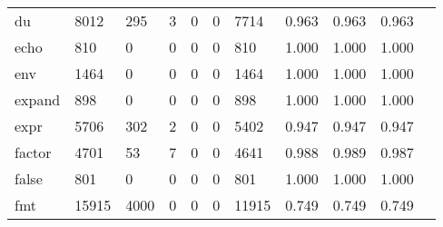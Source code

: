 \begin{longtable}{lp{1.10cm}p{1.10cm}p{1.10cm}p{1.10cm}p{1.10cm}p{1.10cm}p{1.10cm}p{1.10cm}p{1.10cm}p{1.10cm}}
du        &                   8012 &                                295 &                                 3 &                                0 &                                 0 &                            7714 &                             0.963 &                                 0.963 &                               0.963 \\
echo      &                    810 &                                  0 &                                 0 &                                0 &                                 0 &                             810 &                             1.000 &                                 1.000 &                               1.000 \\
env       &                   1464 &                                  0 &                                 0 &                                0 &                                 0 &                            1464 &                             1.000 &                                 1.000 &                               1.000 \\
expand    &                    898 &                                  0 &                                 0 &                                0 &                                 0 &                             898 &                             1.000 &                                 1.000 &                               1.000 \\
expr      &                   5706 &                                302 &                                 2 &                                0 &                                 0 &                            5402 &                             0.947 &                                 0.947 &                               0.947 \\
factor    &                   4701 &                                 53 &                                 7 &                                0 &                                 0 &                            4641 &                             0.988 &                                 0.989 &                               0.987 \\
false     &                    801 &                                  0 &                                 0 &                                0 &                                 0 &                             801 &                             1.000 &                                 1.000 &                               1.000 \\
fmt       &                  15915 &                               4000 &                                 0 &                                0 &                                 0 &                           11915 &                             0.749 &                                 0.749 &                               0.749 \\

\end{longtable}
